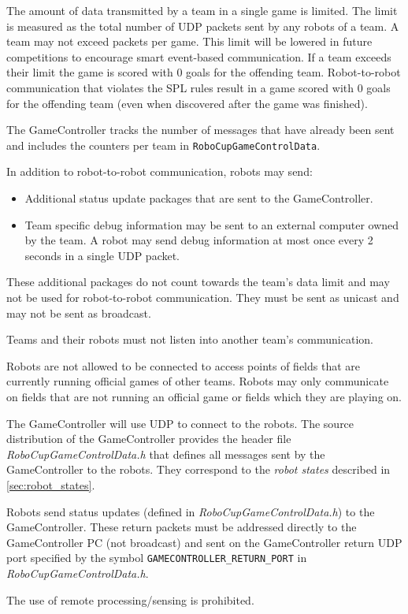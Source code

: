 The amount of data transmitted by a team in a single game is limited. The limit is measured as the total number of UDP packets sent by any robots of a team. A team may not exceed \TeamMessageLimit packets per game. This limit will be lowered in future competitions to encourage smart event-based communication. If a team exceeds their limit the game is scored with 0 goals for the offending team. Robot-to-robot communication that violates the SPL rules result in a game scored with 0 goals for the offending team (even when discovered after the game was finished).

The GameController tracks the number of messages that have already been sent and includes the counters per team in \texttt{RoboCupGameControlData}.

In addition to robot-to-robot communication, robots may send:
\begin{itemize}
 \item Additional status update packages that are sent to the GameController.
 \item Team specific debug information may be sent to an external computer owned by the team. A robot may send debug information at most once every 2 seconds in a single UDP packet.
\end{itemize}
These additional packages do not count towards the team's data limit and may not be used for robot-to-robot communication. They must be sent as unicast and may not be sent as broadcast.

Teams and their robots must not listen into another team's communication.

Robots are not allowed to be connected to access points of fields that are currently running official games of other teams.
Robots may only communicate on fields that are not running an official game or fields which they are playing on.

The GameController will use UDP to connect to the robots. The source distribution of the GameController provides the header file \emph{RoboCupGameControlData.h} that defines all messages sent by the GameController to the robots. They correspond to the \emph{robot states} described in \cref{sec:robot_states}.

Robots send status updates (defined in \emph{RoboCupGameControlData.h}) to the GameController. These return packets must be addressed directly to the GameController PC (\ie not broadcast) and sent on the GameController return UDP port specified by the symbol \verb!GAMECONTROLLER_RETURN_PORT! in \emph{RoboCupGameControlData.h}.

The use of remote processing/sensing is prohibited.
